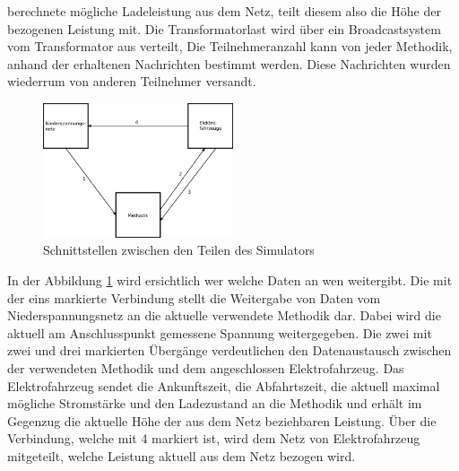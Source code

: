 berechnete mögliche Ladeleistung aus dem Netz, teilt diesem also die Höhe der bezogenen Leistung mit. Die Transformatorlast wird über ein Broadcastsystem vom Transformator aus verteilt, Die Teilnehmeranzahl kann von jeder Methodik, anhand der erhaltenen Nachrichten bestimmt werden. Diese Nachrichten wurden wiederrum von anderen Teilnehmer versandt.\\
\begin{figure}[htb]
\centering
	\includegraphics[width=0.5\textwidth]{img/SimAufbau1.png}
	\caption{Schnittstellen zwischen den Teilen des Simulators}
	\label{Abb_SimAufbau}
\end{figure}

In der Abbildung \ref{Abb_SimAufbau} wird ersichtlich wer welche Daten an wen weitergibt. Die mit der eins markierte Verbindung stellt die Weitergabe von Daten  vom Niederspannungsnetz an die aktuelle verwendete Methodik dar. Dabei wird die aktuell am Anschlusspunkt gemessene Spannung weitergegeben. Die zwei mit zwei und drei markierten Übergänge verdeutlichen den Datenaustausch zwischen der verwendeten Methodik und dem angeschlossen Elektrofahrzeug. Das Elektrofahrzeug sendet die Ankunftszeit, die Abfahrtszeit, die aktuell maximal mögliche Stromstärke und den Ladezustand an die Methodik und erhält im Gegenzug die aktuelle Höhe der aus dem Netz beziehbaren Leistung. Über die Verbindung, welche mit 4 markiert ist, wird dem Netz von Elektrofahrzeug mitgeteilt, welche Leistung aktuell aus dem Netz bezogen wird.
